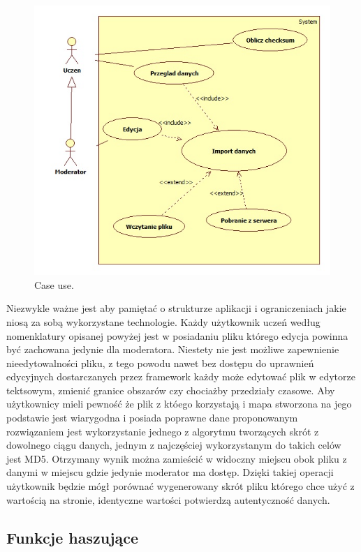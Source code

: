 \begin{figure}[H]
  \centering
    \includegraphics[width=120mm]{ge/caseuse.jpg}
  \caption{Case use.}
  \label{fig:caseuse}
\end{figure}

Niezwykle ważne jest aby pamiętać o strukturze aplikacji i ograniczeniach jakie niosą za sobą wykorzystane technologie. Każdy użytkownik uczeń według nomenklatury opisanej powyżej jest w posiadaniu pliku którego edycja powinna być zachowana jedynie dla moderatora. Niestety nie jest możliwe zapewnienie nieedytowalności pliku, z tego powodu nawet bez dostępu do uprawnień edycyjnych dostarczanych przez framework każdy może edytować plik w edytorze tektsowym, zmienić granice obszarów czy chociażby przedziały czasowe. Aby użytkownicy mieli pewność że plik z któego korzystają i mapa stworzona na jego podstawie jest wiarygodna i posiada poprawne dane proponowanym rozwiązaniem jest wykorzystanie jednego z algorytmu tworzących skrót z dowolnego ciągu danych, jednym z najczęściej wykorzystanym do takich celów jest MD5. Otrzymany wynik można zamieścić w widoczny miejscu obok pliku z danymi w miejscu gdzie jedynie moderator ma dostęp. Dzięki takiej operacji użytkownik będzie mógł porównać wygenerowany skrót pliku którego chce użyć z wartością na stronie, identyczne wartości potwierdzą autentyczność danych.

\subsection{Funkcje haszujące}
\label{sec:hashfunction}

